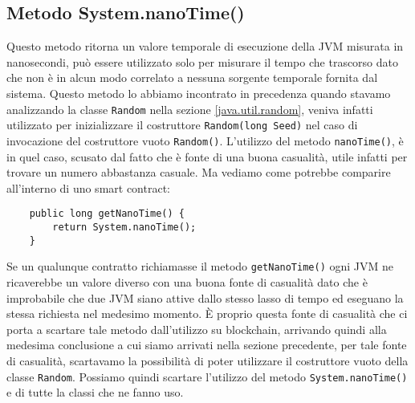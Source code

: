 		\subsection{Metodo System.nanoTime()}
			Questo metodo ritorna un valore temporale di esecuzione della JVM misurata in nanosecondi, può essere utilizzato solo per misurare il tempo che trascorso dato che non è in alcun modo correlato a nessuna sorgente temporale fornita dal sistema. 
			Questo metodo lo abbiamo incontrato in precedenza quando stavamo analizzando la classe \lstinline|Random| nella sezione \ref{java.util.random}, veniva infatti utilizzato per inizializzare il costruttore \lstinline|Random(long Seed)| nel caso di invocazione del costruttore vuoto \lstinline|Random()|. L'utilizzo del metodo \lstinline|nanoTime()|, è in quel caso, scusato dal fatto che è fonte di una buona casualità, utile infatti per trovare un numero abbastanza casuale. Ma vediamo come potrebbe comparire all'interno di uno smart contract:
			\begin{lstlisting}
	public long getNanoTime() {
		return System.nanoTime();
	}
			\end{lstlisting}
			Se un qualunque contratto richiamasse il metodo \lstinline|getNanoTime()| ogni JVM ne ricaverebbe un valore diverso con una buona fonte di casualità dato che è improbabile che due JVM siano attive dallo stesso lasso di tempo ed eseguano la stessa richiesta nel medesimo momento. \`E proprio questa fonte di casualità che ci porta a scartare tale metodo dall'utilizzo su blockchain, arrivando quindi alla medesima conclusione a cui siamo arrivati nella sezione precedente, per tale fonte di casualità, scartavamo la possibilità di poter utilizzare il costruttore vuoto della classe \lstinline|Random|. Possiamo quindi scartare l'utilizzo del metodo \lstinline|System.nanoTime()| e di tutte la classi che ne fanno uso.